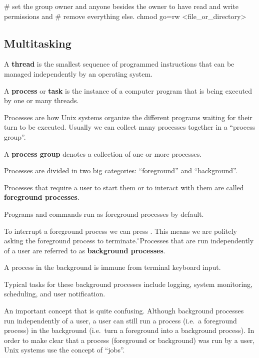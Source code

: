 \begin{bash}
# set the group owner and anyone besides the owner to have read and write permissions and
# remove everything else.
chmod go=rw <file_or_directory>
\end{bash}
\ee

\subsection{Multitasking}

\bd[Thread]
A \textbf{thread} is the smallest sequence of programmed instructions that can be managed independently by an operating
system.
\ed

A \textbf{process} or \textbf{task} is the instance of a computer program that is being executed by one or many threads.
\ed

Processes are how Unix systems organize the different programs waiting for their turn to be executed. Usually we can
collect many processes together in a ``process group''.

A \textbf{process group} denotes a collection of one or more processes.
\ed

Processes are divided in two big categories: ``foreground'' and ``background''.

Processes that require a user to start them or to interact with them are called \textbf{foreground processes}.
\ed

\be
Programs and commands run as foreground processes by default.
\ee

To interrupt a foreground process we can press . This means we are politely asking the foreground process
to terminate. \v

Processes that are run independently of a user are referred to as \textbf{background processes}.
\ed

A process in the background is immune from terminal keyboard input.

\be
Typical tasks for these background processes include logging, system monitoring, scheduling, and user notification.
\ee

An important concept that is quite confusing. Although background processes run independently of a user, a user can
still run a process (i.e.\ a foreground process) in the background (i.e.\ turn a foreground into a background process).
In order to make clear that a process (foreground or background) was run by a user, Unix systems use the concept of
``jobs''.

